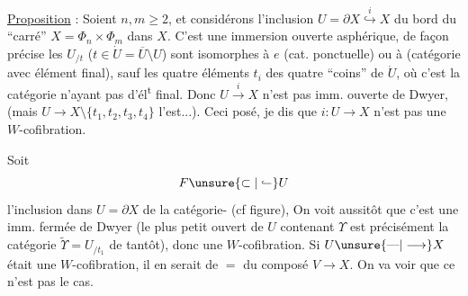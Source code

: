 \uline{Proposition} : Soient $n,m\geq 2$, et considérons l’inclusion $U=\partial X\overset{i}{\hookrightarrow}X$ du bord du ``carré'' $X=\Phi_n\times\Phi_m$ dans $X$. C’est une immersion ouverte asphérique, de façon précise les $U_{/t}$ ($t\in\dot U=\overline U\setminus U$) sont isomorphes à $e$ (cat. ponctuelle) ou à
\diagram{\begin{tikzcd}[ampersand replacement=\&,row sep=tiny,column sep=small]
{} \& {} \& {}\arrow[dl]\\
\unsure{\Phi|\Psi}={} \& {}\\
{} \& {} \& {}\arrow[ul]
\end{tikzcd}}
(catégorie avec élément final), sauf  les quatre éléments $t_i$ des quatre ``coins'' de $\dot U$, où c’est la catégorie
n’ayant  pas d’él\textsuperscript{t} final. Donc $U\xrightarrow{i}X$ n’est pas imm. ouverte de Dwyer, (mais $U\longrightarrow X\setminus\{t_1,t_2,t_3,t_4\}$ l’est...). Ceci posé, je dis que $i:U\longrightarrow X$ n’est pas une $W$-cofibration.

\uline{} Soit
\[
F\unsure{\subset|\lhook\joinrel\relbar}U
\]
l’inclusion dans $U=\partial X$ de la catégorie-
(cf figure),  \unsure{(}On voit aussitôt que c’est une imm. fermée de Dwyer (le plus petit ouvert de $U$ contenant $\Upsilon$ est précisément la catégorie $\widetilde\Upsilon=U_{/t_1}$ de tantôt), donc une $W$-cofibration. Si $U\unsure{\text{---}|\longrightarrow}X$ était une $W$-cofibration, il en serait de $=$ du composé $V\longrightarrow X$. On va voir que ce n’est pas le cas.

